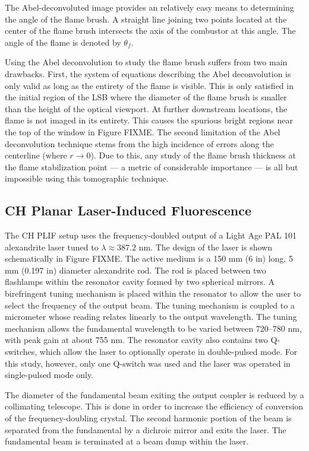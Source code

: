 The Abel-deconvoluted image provides an relatively easy means to determining the angle of the flame brush.
A straight line joining two points located at the center of the flame brush intersects the axis of the combustor at this angle.
The angle of the flame is denoted by \(\theta_f\).

Using the Abel deconvolution to study the flame brush suffers from two main drawbacks.
First, the system of equations describing the Abel deconvolution is only valid as long as the entirety of the flame is visible.
This is only satisfied in the initial region of the LSB where the diameter of the flame brush is smaller than the height of the optical viewport.
At further downstream locations, the flame is not imaged in its entirety.
This causes the spurious bright regions near the top of the window in Figure FIXME.
The second limitation of the Abel deconvolution technique stems from the high incidence of errors along the centerline (where \(r \to 0\)).
Due to this, any study of the flame brush thickness at the flame stabilization point --- a metric of considerable importance --- is all but impossible using this tomographic technique.

\subsection{CH Planar Laser-Induced Fluorescence}

The CH PLIF setup uses the frequency-doubled output of a Light Age PAL 101 alexandrite laser tuned to \(\lambda \approx 387.2\) nm.
The design of the laser is shown schematically in Figure FIXME.
The active medium is a 150 mm (6 in) long, 5 mm (0.197 in) diameter alexandrite rod.
The rod is placed between two flashlamps within the resonator cavity formed by two spherical mirrors.
A birefringent tuning mechanism is placed within the resonator to allow the user to select the frequency of the output beam.
The tuning mechanism is coupled to a micrometer whose reading relates linearly to the output wavelength.
The tuning mechanism allows the fundamental wavelength to be varied between 720--780 nm, with peak gain at about 755 nm.
The resonator cavity also contains two Q-switches, which allow the laser to optionally operate in double-pulsed mode.
For this study, however, only one Q-switch was used and the laser was operated in single-pulsed mode only.

The diameter of the fundamental beam exiting the output coupler is reduced by a collimating telescope.
This is done in order to increase the efficiency of conversion of the frequency-doubling crystal.
The second harmonic portion of the beam is separated from the fundamental by a dichroic mirror and exits the laser.
The fundamental beam is terminated at a beam dump within the laser.

